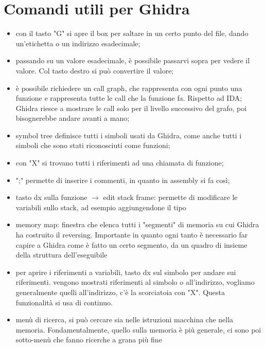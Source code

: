 \documentclass[12pt, oneside]{extbook}
\begin{document}
\section*{Comandi utili per Ghidra}
\begin{itemize}
\item con il tasto "G" si apre il box per saltare in un certo punto del file, dando un'etichetta o un indirizzo esadecimale;
\item passando su un valore esadecimale, è possibile passarvi sopra per vedere il valore. Col tasto destro si può convertire il valore;
\item è possibile richiedere un call graph, che rappresenta con ogni punto una funzione e rappresenta tutte le call che la funzione fa. Rispetto ad IDA; Ghidra riesce a mostrare le call solo per il livello successivo del grafo, poi bisognerebbe andare avanti a mano;
\item symbol tree definisce tutti i simboli usati da Ghidra, come anche tutti i simboli che sono stati riconosciuti come funzioni;
\item con "X" si trovano tutti i riferimenti ad una chiamata di funzione;
\item ";" permette di inserire i commenti, in quanto in assembly si fa così;
\item tasto dx sulla funzione $\rightarrow$ edit stack frame: permette di modificare le variabili sullo stack, ad esempio aggiungendone il tipo
\item memory map: finestra che elenca tutti i "segmenti" di memoria su cui Ghidra ha costruito il reversing. Importante in quanto ogni tanto è necessario far capire a Ghidra come è fatto un certo segmento, da un quadro di insieme della struttura dell'eseguibile
\item per aprire i riferimenti a variabili, tasto dx sul simbolo per andare sui riferimenti. vengono mostrati riferimenti al simbolo o all'indirizzo, vogliamo generalmente quelli all'indirizzo, c'è la scorciatoia con "X". Questa funzionalità si usa di continuo.
\item menù di ricerca, si può cercare sia nelle istruzioni macchina che nella memoria. Fondamentalmente, quello sulla memoria è più generale, ci sono poi sotto-menù che fanno ricerche a grana più fine
\end{itemize}
\end{document}
